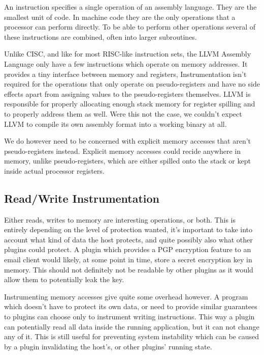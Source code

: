 An instruction specifies a single operation of an assembly language. They are
the smallest unit of code. In machine code they are the only operations that a
processor can perform directly. To be able to perform other operations several
of these instructions are combined, often into larger subroutines.

Unlike CISC, and like for most RISC-like instruction sets, the LLVM Assembly
Language only have a few instructions which operate on memory addresses. It
provides a tiny interface between memory and registers, Instrumentation isn't
required for the operations that only operate on pseudo-registers and have no
side effects apart from assigning values to the pseudo-registers themselves.
LLVM is responsible for properly allocating enough stack memory for register
spilling and to properly address them as well. Were this not the case, we
couldn't expect LLVM to compile its own assembly format into a working binary at
all.

We do however need to be concerned with explicit memory accesses that aren't
pseudo-registers instead. Explicit memory accesses could recide anywhere in
memory, unlike pseudo-registers, which are either spilled onto the stack or kept
inside actual processor registers.

\subsection {Read/Write Instrumentation}

Either reads, writes to memory are interesting operations, or both. This is
entirely depending on the level of protection wanted, it's important to take
into account what kind of data the host protects, and quite possibly also what
other plugins could protect. A plugin which provides a PGP encryption feature to
an email client would likely, at some point in time, store a secret encryption
key in memory. This should not definitely not be readable by other plugins as it
would allow them to potentially leak the key.

Instrumenting memory accesses give quite some overhead however. A program which
doesn't have to protect its own data, or need to provide similar guarantees to
plugins can choose only to instrument writing instructions. This way a plugin
can potentially read all data inside the running application, but it can not
change any of it. This is still useful for preventing system instability which
can be caused by a plugin invalidating the host's, or other plugins' running
state.

